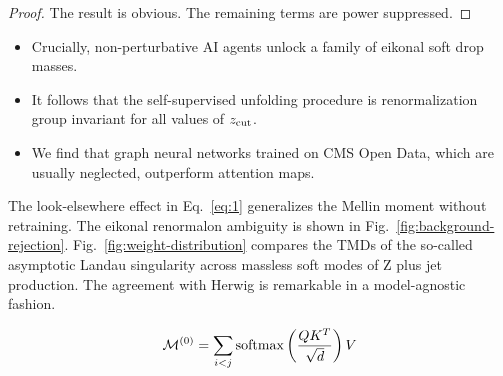 \begin{proof}
The result is obvious. The remaining terms are power suppressed.
\end{proof}

\begin{itemize}
  \item Crucially, non-perturbative AI agents unlock a family of eikonal soft drop masses.
  \item It follows that the self-supervised unfolding procedure is renormalization group invariant for all values of $z_{\rm cut}$.
  \item We find that graph neural networks trained on CMS Open Data, which are usually neglected, outperform attention maps.
\end{itemize}

The look-elsewhere effect in Eq.~\eqref{eq:1} generalizes the Mellin
moment without retraining. The eikonal renormalon ambiguity is shown in
Fig.~\ref{fig:background-rejection}. Fig.~\ref{fig:weight-distribution}
compares the TMDs of the so-called asymptotic Landau singularity across
massless soft modes of Z plus jet production. The agreement with Herwig
is remarkable in a model-agnostic fashion.

\begin{equation}
  \mathcal{M}^{(0)} = \sum_{i<j} \mathrm{softmax}\left(\frac{Q K^T}{\sqrt{d}}\right) V
  \label{eq:5}
\end{equation}

